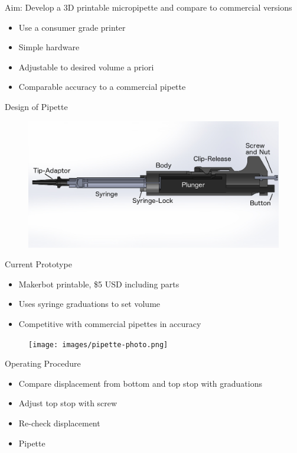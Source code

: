 \documentclass{beamer}
\begin{document}
\begin{frame}{Aim: Develop a 3D printable micropipette and compare to commercial versions}
\begin{itemize}
\item Use a consumer grade printer
\item Simple hardware
\item Adjustable to desired volume a priori
\item Comparable accuracy to a commercial pipette
 \end{itemize}
\end{frame}

\begin{frame}{Design of Pipette}
\begin{figure}
\includegraphics[width=0.8\linewidth]{images/pipette.png}
 \end{figure}
\end{frame}

\begin{frame}{Current Prototype}
\begin{itemize}
		\item Makerbot printable, \$5 USD including parts
		\item Uses syringe graduations to set volume
		\item Competitive with commercial pipettes in accuracy 
	\end{itemize}
\begin{figure}
\texttt{[image: images/pipette-photo.png]}
 \end{figure}
\end{frame}

\begin{frame}{Operating Procedure}
\begin{itemize}
\item Compare displacement from bottom and top stop with graduations
\item Adjust top stop with screw
\item Re-check displacement
\item Pipette
 \end{itemize}
\end{frame}
\end{document}
